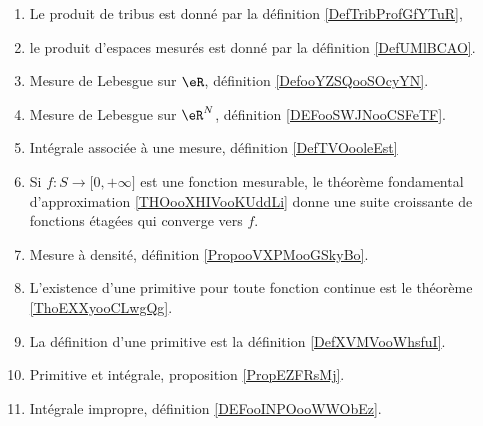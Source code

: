 
\begin{enumerate}
    \item Le produit de tribus est donné par la définition \ref{DefTribProfGfYTuR},     %
    \item le produit d'espaces mesurés est donné par la définition \ref{DefUMlBCAO}.     %
        \item
            Mesure de Lebesgue sur \( \eR\), définition \ref{DefooYZSQooSOcyYN}.
        \item
            Mesure de Lebesgue sur \( \eR^N\), définition \ref{DEFooSWJNooCSFeTF}.
        \item
            Intégrale associée à une mesure, définition \ref{DefTVOooleEst}
        \item
            Si \( f\colon S\to \mathopen[ 0 , +\infty \mathclose]\) est une fonction mesurable, le théorème fondamental d'approximation \ref{THOooXHIVooKUddLi} donne une suite croissante de fonctions étagées qui converge vers \( f\).
        \item
            Mesure à densité, définition \ref{PropooVXPMooGSkyBo}.
    \item
        L'existence d'une primitive pour toute fonction continue est le théorème \ref{ThoEXXyooCLwgQg}.
    \item
        La définition d'une primitive est la définition \ref{DefXVMVooWhsfuI}.
    \item
        Primitive et intégrale, proposition \ref{PropEZFRsMj}.
    \item
        Intégrale impropre, définition \ref{DEFooINPOooWWObEz}.
\end{enumerate}

